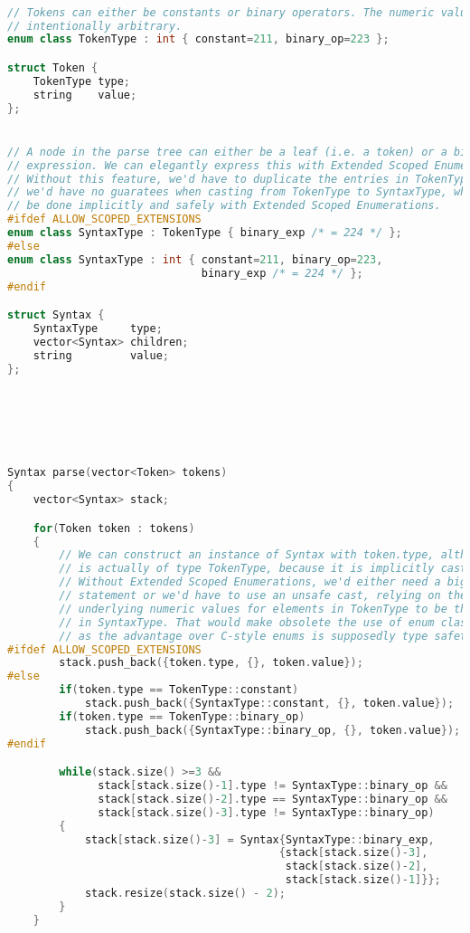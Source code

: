 \documentclass{scrartcl}
\begin{document}
{\footnotesize
\begin{lstlisting}[language=C++]

// Tokens can either be constants or binary operators. The numeric values are
// intentionally arbitrary.
enum class TokenType : int { constant=211, binary_op=223 };

struct Token {
    TokenType type;
    string    value;
};


// A node in the parse tree can either be a leaf (i.e. a token) or a binary
// expression. We can elegantly express this with Extended Scoped Enumerations.
// Without this feature, we'd have to duplicate the entries in TokenType and
// we'd have no guaratees when casting from TokenType to SyntaxType, which can
// be done implicitly and safely with Extended Scoped Enumerations.
#ifdef ALLOW_SCOPED_EXTENSIONS
enum class SyntaxType : TokenType { binary_exp /* = 224 */ };
#else
enum class SyntaxType : int { constant=211, binary_op=223,
                              binary_exp /* = 224 */ };
#endif

struct Syntax {
    SyntaxType     type;
    vector<Syntax> children;
    string         value;
};






Syntax parse(vector<Token> tokens)
{
    vector<Syntax> stack;

    for(Token token : tokens)
    {
        // We can construct an instance of Syntax with token.type, although it
        // is actually of type TokenType, because it is implicitly cast.
        // Without Extended Scoped Enumerations, we'd either need a big switch
        // statement or we'd have to use an unsafe cast, relying on the
        // underlying numeric values for elements in TokenType to be the same as
        // in SyntaxType. That would make obsolete the use of enum class,
        // as the advantage over C-style enums is supposedly type safety.
#ifdef ALLOW_SCOPED_EXTENSIONS
        stack.push_back({token.type, {}, token.value});
#else
        if(token.type == TokenType::constant)
            stack.push_back({SyntaxType::constant, {}, token.value});
        if(token.type == TokenType::binary_op)
            stack.push_back({SyntaxType::binary_op, {}, token.value});
#endif

        while(stack.size() >=3 &&
              stack[stack.size()-1].type != SyntaxType::binary_op &&
              stack[stack.size()-2].type == SyntaxType::binary_op &&
              stack[stack.size()-3].type != SyntaxType::binary_op)
        {
            stack[stack.size()-3] = Syntax{SyntaxType::binary_exp,
                                          {stack[stack.size()-3],
                                           stack[stack.size()-2],
                                           stack[stack.size()-1]}};
            stack.resize(stack.size() - 2);
        }
    }


\end{lstlisting}}
\end{document}
